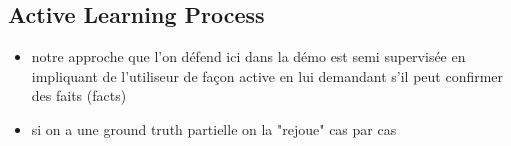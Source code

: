 \subsection{Active Learning Process}
\begin{itemize}
 \item notre approche que l'on défend ici dans la démo est  semi supervisée en impliquant de l'utiliseur de façon active
en lui demandant s'il peut confirmer des faits (facts)
\item si on a une ground truth partielle on la "rejoue" cas par cas
\end{itemize}

